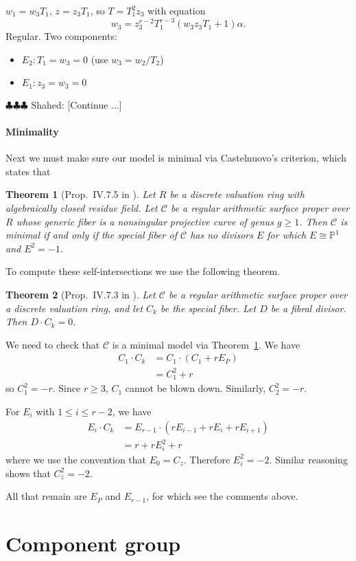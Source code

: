 \documentclass{article}
\newcommand{\shahed}[1]{{\color{Purple} \sf $\clubsuit\clubsuit\clubsuit$ Shahed: [#1]}}
\newcommand{\scd}{\mathscr{C}}
\theoremstyle{plain}
\newtheorem{theorem}{Theorem}[section]
\theoremstyle{definition}
\theoremstyle{remark}
\newcommand{\isom}{\cong}
\newcommand{\Pro}{\ensuremath{\mathbb{P}}}
\begin{document}
$w_1 = w_3 T_1$, $z = z_3 T_1$, so $T = T_1^2 z_3$ with equation
\[
w_3 = z_3^{r-2} T_1^{r-3} (w_3 z_3 T_1 + 1) \alpha.
\]
Regular. Two components:
\begin{itemize}
    \item $E_2: T_1 = w_3 = 0$ (use $w_3 = w_2/T_2$)
    \item $E_1: z_3 = w_3 = 0$
\end{itemize}

\shahed{Continue ...}






\paragraph{Minimality}
\label{sec:minimality}

Next we must make sure our model is minimal via Castelnuovo's criterion, which states that
\begin{theorem}[Prop.~IV.7.5 in \cite{silvermanATAEC}]\label{thm:castelnuovo}
  Let $R$ be a discrete valuation ring with algebraically closed residue field. Let $\scd$ be a regular arithmetic surface proper over $R$ whose generic fiber is a nonsingular projective curve of genus $g \geq 1$. Then $\scd$ is minimal if and only if the special fiber of $\scd$ has no divisors $E$ for which $E \isom \Pro^1$ and $E^2 = -1$.
\end{theorem}

To compute these self-intersections we use the following theorem.
\begin{theorem}[Prop.~IV.7.3 in \cite{silvermanATAEC}]\label{thm:fibral-intersect-total}
  Let $\scd$ be a regular arithmetic surface proper over a discrete valuation ring, and let $C_k$ be the special fiber. Let $D$ be a fibral divisor. Then $D \cdot C_k = 0$.
\end{theorem}

We need to check that $\scd$ is a minimal model via Theorem~\ref{thm:castelnuovo}. We have
\begin{align*}
  C_1 \cdot C_k &= C_1 \cdot (C_1 + rE_{P}) \\
  &= C_1^2 + r
\end{align*}
so $C_1^2 = -r$. Since $r \geq 3$, $C_1$ cannot be blown down. Similarly, $C_2^2 = -r$.

For $E_{i}$ with $1 \leq i \leq r-2$, we have
\begin{align*}
  E_{i} \cdot C_k &= E_{r-1} \cdot (rE_{i-1} + rE_{i} + rE_{i+1}) \\
  &= r + rE_i^2 + r
\end{align*}
where we use the convention that $E_0 = C_z$. Therefore $E_i^2 = -2$. Similar reasoning shows that $C_z^2 = -2$.

All that remain are $E_P$ and $E_{r-1}$, for which see the comments above.

\section{Component group}
\label{sec:component-group}





\end{document}
